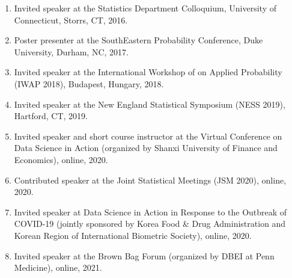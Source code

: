 \documentclass[12pt,letterpaper]{article}
\newenvironment{cventry}{\begin{minipage}[t]{\linewidth}}{\end{minipage}}
\begin{document}
\begin{enumerate}
\begin{cventry}
		\par\end{cventry}
		\item\begin{cventry} Invited speaker at the Statistics Department Colloquium, University of Connecticut, Storrs, CT, 2016.
		\par\end{cventry}
		\item\begin{cventry} Poster presenter at the SouthEastern Probability Conference, Duke University, Durham, NC, 2017.
		\par\end{cventry}
		\item\begin{cventry} Invited speaker at the International Workshop of on 
		Applied Probability (IWAP 2018), Budapest, Hungary, 2018.
		\par\end{cventry}
		\item\begin{cventry} Invited speaker at the New England Statistical Symposium (NESS 2019), Hartford, CT, 2019.
		\par\end{cventry}
		\item\begin{cventry} Invited speaker and short course instructor at the Virtual Conference on Data Science in Action (organized by Shanxi 	University of Finance and Economics), online, 2020.
		\par\end{cventry}
		\item\begin{cventry} Contributed speaker at the Joint Statistical Meetings 
		(JSM 2020), online, 2020.
		\par\end{cventry}
		\item\begin{cventry} Invited speaker at Data Science in Action in Response to the Outbreak of COVID-19 (jointly sponsored by Korea Food \& Drug Administration and	Korean Region of International Biometric Society), online, 2020.
		\par\end{cventry}
		\item\begin{cventry} Invited speaker at the Brown Bag Forum (organized by DBEI at Penn Medicine), online, 2021.
		\par\end{cventry}

\end{enumerate}
\end{document}

